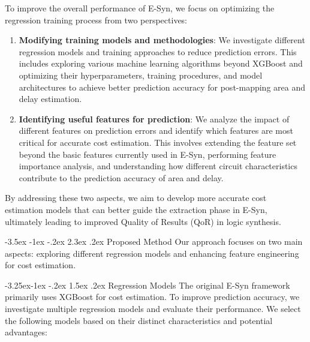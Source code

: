 \documentclass[10pt,twocolumn]{article}
\makeatletter
\renewcommand\section{\@startsection {section}{1}{\z@}%
                                   {-3.5ex \@plus -1ex \@minus -.2ex}%
                                   {2.3ex \@plus.2ex}%
                                   {\normalfont\large\bfseries}}
\renewcommand\subsection{\@startsection{subsection}{2}{\z@}%
                                     {-3.25ex\@plus -1ex \@minus -.2ex}%
                                     {1.5ex \@plus .2ex}%
                                     {\normalfont\normalsize\bfseries}}
\makeatother
\begin{document}
To improve the overall performance of E-Syn, we focus on optimizing the regression training process from two perspectives:

\begin{enumerate}
\item \textbf{Modifying training models and methodologies}: We investigate different regression models and training approaches to reduce prediction errors. This includes exploring various machine learning algorithms beyond XGBoost and optimizing their hyperparameters, training procedures, and model architectures to achieve better prediction accuracy for post-mapping area and delay estimation.

\item \textbf{Identifying useful features for prediction}: We analyze the impact of different features on prediction errors and identify which features are most critical for accurate cost estimation. This involves extending the feature set beyond the basic features currently used in E-Syn, performing feature importance analysis, and understanding how different circuit characteristics contribute to the prediction accuracy of area and delay.
\end{enumerate}

By addressing these two aspects, we aim to develop more accurate cost estimation models that can better guide the extraction phase in E-Syn, ultimately leading to improved Quality of Results (QoR) in logic synthesis.

\section{Proposed Method}
Our approach focuses on two main aspects: exploring different regression models and enhancing feature engineering for cost estimation.

\subsection{Regression Models}
The original E-Syn framework primarily uses XGBoost for cost estimation. To improve prediction accuracy, we investigate multiple regression models and evaluate their performance. We select the following models based on their distinct characteristics and potential advantages:
\end{document}
